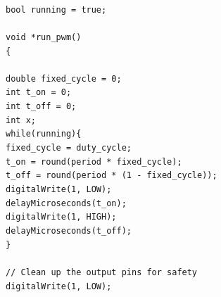 \documentclass[a4paper, 12pt]{article}
\begin{document}
\begin{appendices}
	\texttt{ \\\noindent}
	\texttt{bool running = true;} \\\noindent
	\texttt{ \\\noindent}
	\texttt{void *run\_pwm()} \\\noindent
	\texttt{\{ \\\noindent}
	\texttt{ \\\noindent}
	\texttt{\hspace*{1em}double fixed\_cycle = 0;} \\\noindent
	\texttt{\hspace*{1em}int t\_on = 0;} \\\noindent
	\texttt{\hspace*{1em}int t\_off = 0;} \\\noindent
	\texttt{\hspace*{1em}int x;} \\\noindent
	\texttt{\hspace*{1em}while(running)\{ \\\noindent}
	\texttt{\hspace*{2em}fixed\_cycle = duty\_cycle;} \\\noindent
	\texttt{\hspace*{2em}t\_on = round(period * fixed\_cycle);} \\\noindent
	\texttt{\hspace*{2em}t\_off = round(period * (1 - fixed\_cycle));} \\\noindent
	\texttt{\hspace*{2em}digitalWrite(1, LOW);} \\\noindent
	\texttt{\hspace*{2em}delayMicroseconds(t\_on);} \\\noindent
	\texttt{\hspace*{2em}digitalWrite(1, HIGH);} \\\noindent
	\texttt{\hspace*{2em}delayMicroseconds(t\_off);} \\\noindent
      \texttt{\hspace*{1em}\}} \\\noindent
	\texttt{\hspace*{1em}	} \\\noindent
	\texttt{\hspace*{1em}// Clean up the output pins for safety} \\\noindent
	\texttt{\hspace*{1em}digitalWrite(1, LOW);} \\\noindent

\end{appendices}
\end{document}
